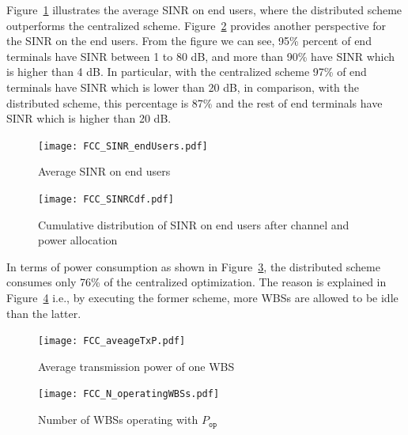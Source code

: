 \documentclass[times]{ettauth}
\newcommand{\ie}{i.e., }
\theoremstyle{mytheoremstyle}
\theoremstyle{mytheoremstyle}
\theoremstyle{mytheoremstyle}
\begin{document}
Figure~\ref{FCCSINREndUsers} illustrates the average SINR on end users, where the distributed scheme outperforms the centralized scheme.
Figure~\ref{FCCSINRCdf} provides another perspective for the SINR on the end users.
From the figure we can see, 95\% percent of end terminals have SINR between 1 to 80 dB, and more than 90\% have SINR which is higher than 4 dB.
In particular, with the centralized scheme 97\% of end terminals have SINR which is lower than 20 dB, in comparison, with the distributed scheme, this percentage is 87\% and the rest of end terminals have SINR which is higher than 20 dB.

\begin{figure}[h!]
  \centering
      \texttt{[image: FCC\_SINR\_endUsers.pdf]}
  		\caption{Average SINR on end users}
     \label{FCCSINREndUsers}
\end{figure}


\begin{figure}[h!]
  \centering
      \texttt{[image: FCC\_SINRCdf.pdf]}
  		\caption{Cumulative distribution of SINR on end users after channel and power allocation}
     \label{FCCSINRCdf}
\end{figure}

In terms of power consumption as shown in Figure~\ref{FCCTxpower}, the distributed scheme consumes only 76\% of the centralized optimization.
The reason is explained in Figure~\ref{FCC_N_operatingWBSs} \ie by executing the former scheme, more WBSs are allowed to be idle than the latter.

\begin{figure}[h!]
  \centering
  \texttt{[image: FCC\_aveageTxP.pdf]}
  \caption{Average transmission power of one WBS}
\label{FCCTxpower}
\end{figure}

\begin{figure}[h!]
  \centering
  \texttt{[image: FCC\_N\_operatingWBSs.pdf]}
  \caption{Number of WBSs operating with $P_{\mathtt{op}}$}
\label{FCC_N_operatingWBSs}
\end{figure}
\end{document}
